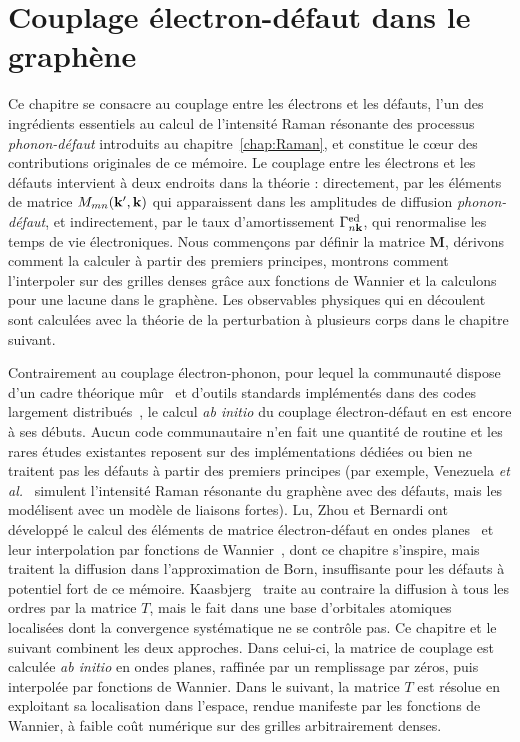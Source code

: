 \chapter{Couplage électron-défaut dans le graphène}\label{chap:défauts}

Ce chapitre se consacre au couplage entre les électrons et les défauts, l'un des ingrédients essentiels au calcul de l'intensité Raman résonante des processus \textit{phonon-défaut} introduits au chapitre~\ref{chap:Raman}, et constitue le c\oe ur des contributions originales de ce mémoire. Le couplage entre les électrons et les défauts intervient à deux endroits dans la théorie : directement, par les éléments de matrice $M_{mn}(\mathbf{k}',\mathbf{k})$ qui apparaissent dans les amplitudes de diffusion \textit{phonon-défaut}, et indirectement, par le taux d'amortissement $\Gamma_{n\mathbf{k}}^\text{ed}$, qui renormalise les temps de vie électroniques. Nous commençons par définir la matrice $\bm M$, dérivons comment la calculer à partir des premiers principes, montrons comment l'interpoler sur des grilles denses grâce aux fonctions de Wannier et la calculons pour une lacune dans le graphène. Les observables physiques qui en découlent sont calculées avec la théorie de la perturbation à plusieurs corps dans le chapitre suivant.

Contrairement au couplage électron-phonon, pour lequel la communauté dispose d'un cadre théorique mûr~\cite{giustinoElectronphononInteractionsFirst2017,giustinoElectronphononInteractionUsing2007} et d'outils standards implémentés dans des codes largement distribués~\cite{ponceEPWElectronphononCoupling2016,leeElectronPhononPhysics2023a,zhouPerturboSoftwarePackage2021,gonzeAbinitProjectImpact2020,bruninPhononlimitedElectronMobility2020}, le calcul \textit{ab initio} du couplage électron-défaut en est encore à ses débuts. Aucun code communautaire n'en fait une quantité de routine et les rares études existantes reposent sur des implémentations dédiées ou bien ne traitent pas les défauts à partir des premiers principes (par exemple, Venezuela \textit{et al.}~\cite{venezuelaTheoryDoubleresonantRaman2011} simulent l'intensité Raman résonante du graphène avec des défauts, mais les modélisent avec un modèle de liaisons fortes). Lu, Zhou et Bernardi ont développé le calcul des éléments de matrice électron-défaut en ondes planes~\cite{luEfficientInitioCalculations2019} et leur interpolation par fonctions de Wannier~\cite{luInitioElectrondefectInteractions2020}, dont ce chapitre s'inspire, mais traitent la diffusion dans l'approximation de Born, insuffisante pour les défauts à potentiel fort de ce mémoire. Kaasbjerg~\cite{kaasbjergAtomisticMatrixTheory2020} traite au contraire la diffusion à tous les ordres par la matrice $T$, mais le fait dans une base d'orbitales atomiques localisées dont la convergence systématique ne se contrôle pas. Ce chapitre et le suivant combinent les deux approches. Dans celui-ci, la matrice de couplage est calculée \textit{ab initio} en ondes planes, raffinée par un remplissage par zéros, puis interpolée par fonctions de Wannier. Dans le suivant, la matrice $T$ est résolue en exploitant sa localisation dans l'espace, rendue manifeste par les fonctions de Wannier, à faible coût numérique sur des grilles arbitrairement denses.

